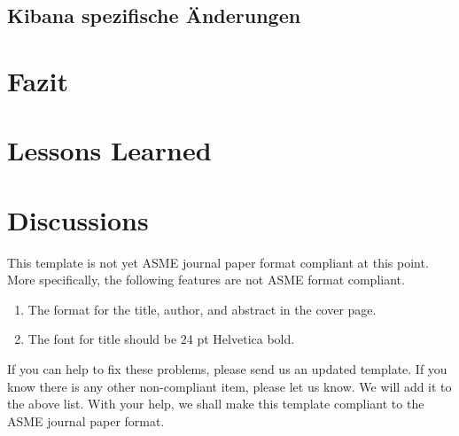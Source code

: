 \documentclass[twocolumn,10pt]{asme2ej}
\begin{document}
\subsection{Kibana spezifische \"Anderungen}


\section{Fazit}

\section{Lessons Learned}
\section{Discussions}
This template is not yet ASME journal paper format compliant at this point.
More specifically, the following features are not ASME format compliant.
\begin{enumerate}
\item
The format for the title, author, and abstract in the cover page.
\item
The font for title should be 24 pt Helvetica bold.
\end{enumerate}

\noindent
If you can help to fix these problems, please send us an updated template.
If you know there is any other non-compliant item, please let us know.
We will add it to the above list.
With your help, we shall make this template 
compliant to the ASME journal paper format.


\begin{acknowledgment}

\end{acknowledgment}

%




\end{document}
